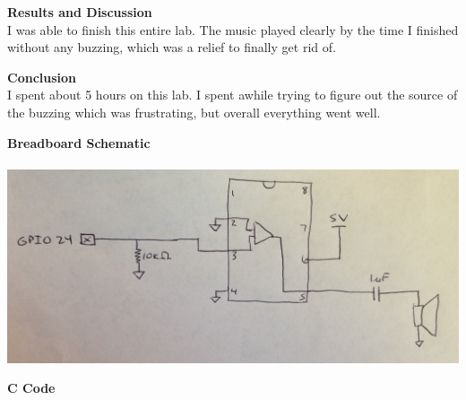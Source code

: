 \documentclass[11pt,letterpaper]{article}
\begin{document}
\noindent\textbf{Results and Discussion}\\
I was able to finish this entire lab. The music played clearly by the time I finished without any buzzing, which was a relief to finally get rid of.

\noindent\textbf{Conclusion}\\
I spent about 5 hours on this lab. I spent awhile trying to figure out the source of the buzzing which was frustrating, but overall everything went well.


\pagebreak

\noindent\textbf{Breadboard Schematic}\\\\
\includegraphics[scale=0.15]{lab5schematic}


\noindent\textbf{C Code}\\
\lstset{language=C}

\end{document}
